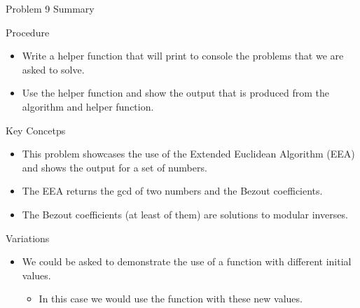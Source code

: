 \begin{summary}{Problem 9 Summary}
    \begin{statement}{Procedure}
        \begin{itemize}
            \item Write a helper function that will print to console the problems that we are asked to solve.
            \item Use the helper function and show the output that is produced from the algorithm and helper function.
        \end{itemize}
    \end{statement}
    \begin{statement}{Key Concetps}
        \begin{itemize}
            \item This problem showcases the use of the Extended Euclidean Algorithm (EEA) and shows the output for a set of numbers.
            \item The EEA returns the gcd of two numbers and the Bezout coefficients.
            \item The Bezout coefficients (at least of them) are solutions to modular inverses.
        \end{itemize}
    \end{statement}
    \begin{statement}{Variations}
        \begin{itemize}
            \item We could be asked to demonstrate the use of a function with different initial values.
            \begin{itemize}
                \item In this case we would use the function with these new values.
            \end{itemize}
        \end{itemize}
    \end{statement}
\end{summary}

